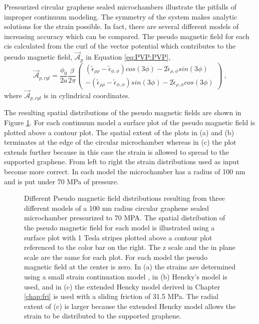 Pressurized circular graphene sealed microchambers illustrate the pitfalls of improper continuum modeling.
The symmetry of the system makes analytic solutions for the strain possible.
In fact, there are several different models of increasing accuracy which can be compared.
The pseudo magnetic field for each cis calculated from the curl of the vector potential which contributes to the pseudo magnetic field, $\vec{\mathcal{A}}_p$ in Equation \ref{eq:PVP:PVP}, 
\begin{equation*}
\vec{\mathcal{A}}_{p,cyl}=\frac{\phi_0}{2a} \frac{\beta}{2 \pi}
  \left( \begin{array}{c}
    (\tilde{\epsilon}_{\rho\rho}-\tilde{\epsilon}_{\phi,\phi}) cos(3\phi)-2 \tilde{\epsilon}_{\rho,\phi} sin (3 \phi) \\
    -(\tilde{\epsilon}_{\rho\rho}-\tilde{\epsilon}_{\phi,\phi}) sin(3\phi)-2 \tilde{\epsilon}_{\rho,\phi} cos (3 \phi)
  \end{array} \right) \ ,
\end{equation*}
where $\vec{\mathcal{A}}_{p,cyl}$ is in cylindrical coordinates.

The resulting spatial distributions of the pseudo magnetic fields are shown in Figure \ref{fig:PVP:circle}.
For each continuum model a surface plot of the pseudo magnetic field is plotted above a contour plot.
The spatial extent of the plots in (a) and (b) terminates at the edge of the circular microchamber whereas in (c) the plot extends further because in this case the strain is allowed to spread to the supported graphene.
From left to right the strain distributions used as input become more correct.
In each model the microchamber has a radius of 100 nm and is put under 70 MPa of pressure.

\begin{figure}
  \begin{center}
  
  \end{center}
  \caption[Different pseudo magnetic field distributions resulting from three different models]{\label{fig:PVP:circle} Different Pseudo magnetic field distributions resulting from three different models of a 100 nm radius circular graphene sealed microchamber pressurized to 70 MPA. The spatial distribution of the pseudo magnetic field for each model is illustrated using a surface plot with 1 Tesla stripes plotted above a contour plot referenced to the color bar on the right. The z scale and the in plane scale are the same for each plot.  For each model the pseudo magnetic field at the center is zero. In (a) the strains are determined using a small strain continuation model \cite{Timoshenko}, in (b) Hencky's model \cite{Hencky1915} is used, and in (c) the extended Hencky model derived in Chapter \ref{chap:fri} is used with a sliding friction of 31.5 MPa.  The radial extent of (c) is larger because the extended Hencky model allows the strain to be distributed to the supported graphene.}
\end{figure}

